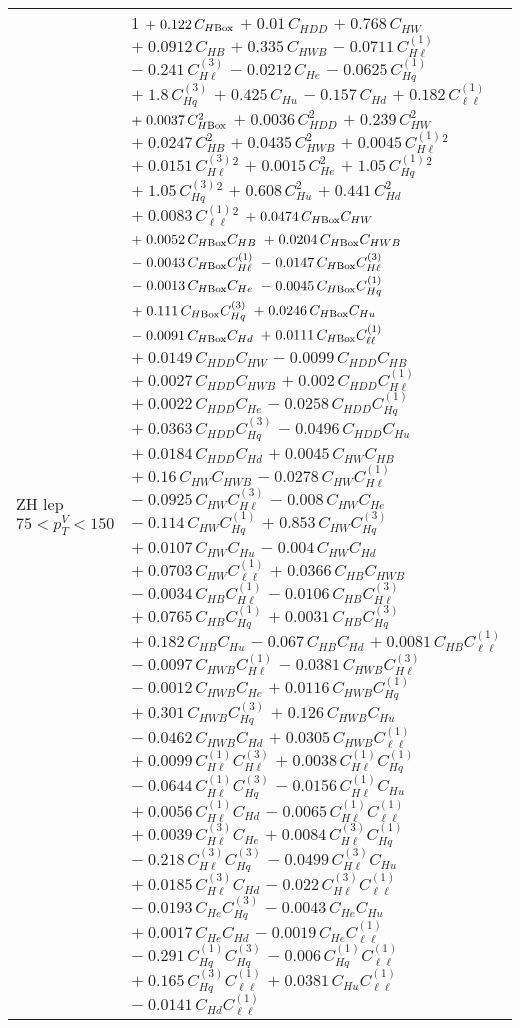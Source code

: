 \begin{tabular}{l|p{}}
    ZH lep $75 < p_{T}^{V} < 150$ & 1 $+\;0.122\,C_{H\rm{Box}}$ $+\;0.01\,C_{HDD}$ $+\;0.768\,C_{HW}$ $+\;0.0912\,C_{HB}$ $+\;0.335\,C_{HWB}$ $-\;0.0711\,C^{(1)}_{H\ell}$ $-\;0.241\,C^{(3)}_{H\ell}$ $-\;0.0212\,C_{He}$ $-\;0.0625\,C^{(1)}_{Hq}$ $+\;1.8\,C^{(3)}_{Hq}$ $+\;0.425\,C_{Hu}$ $-\;0.157\,C_{Hd}$ $+\;0.182\,C^{(1)}_{\ell\ell}$ $+\;0.0037\,C_{H\rm{Box}}^{2}$ $+\;0.0036\,C_{HDD}^{2}$ $+\;0.239\,C_{HW}^{2}$ $+\;0.0247\,C_{HB}^{2}$ $+\;0.0435\,C_{HWB}^{2}$ $+\;0.0045\,C^{(1)}_{H\ell}^{2}$ $+\;0.0151\,C^{(3)}_{H\ell}^{2}$ $+\;0.0015\,C_{He}^{2}$ $+\;1.05\,C^{(1)}_{Hq}^{2}$ $+\;1.05\,C^{(3)}_{Hq}^{2}$ $+\;0.608\,C_{Hu}^{2}$ $+\;0.441\,C_{Hd}^{2}$ $+\;0.0083\,C^{(1)}_{\ell\ell}^{2}$ $+\;0.0474\,C_{H\rm{Box}}C_{HW}$ $+\;0.0052\,C_{H\rm{Box}}C_{HB}$ $+\;0.0204\,C_{H\rm{Box}}C_{HWB}$ $-\;0.0043\,C_{H\rm{Box}}C^{(1)}_{H\ell}$ $-\;0.0147\,C_{H\rm{Box}}C^{(3)}_{H\ell}$ $-\;0.0013\,C_{H\rm{Box}}C_{He}$ $-\;0.0045\,C_{H\rm{Box}}C^{(1)}_{Hq}$ $+\;0.111\,C_{H\rm{Box}}C^{(3)}_{Hq}$ $+\;0.0246\,C_{H\rm{Box}}C_{Hu}$ $-\;0.0091\,C_{H\rm{Box}}C_{Hd}$ $+\;0.0111\,C_{H\rm{Box}}C^{(1)}_{\ell\ell}$ $+\;0.0149\,C_{HDD}C_{HW}$ $-\;0.0099\,C_{HDD}C_{HB}$ $+\;0.0027\,C_{HDD}C_{HWB}$ $+\;0.002\,C_{HDD}C^{(1)}_{H\ell}$ $+\;0.0022\,C_{HDD}C_{He}$ $-\;0.0258\,C_{HDD}C^{(1)}_{Hq}$ $+\;0.0363\,C_{HDD}C^{(3)}_{Hq}$ $-\;0.0496\,C_{HDD}C_{Hu}$ $+\;0.0184\,C_{HDD}C_{Hd}$ $+\;0.0045\,C_{HW}C_{HB}$ $+\;0.16\,C_{HW}C_{HWB}$ $-\;0.0278\,C_{HW}C^{(1)}_{H\ell}$ $-\;0.0925\,C_{HW}C^{(3)}_{H\ell}$ $-\;0.008\,C_{HW}C_{He}$ $-\;0.114\,C_{HW}C^{(1)}_{Hq}$ $+\;0.853\,C_{HW}C^{(3)}_{Hq}$ $+\;0.0107\,C_{HW}C_{Hu}$ $-\;0.004\,C_{HW}C_{Hd}$ $+\;0.0703\,C_{HW}C^{(1)}_{\ell\ell}$ $+\;0.0366\,C_{HB}C_{HWB}$ $-\;0.0034\,C_{HB}C^{(1)}_{H\ell}$ $-\;0.0106\,C_{HB}C^{(3)}_{H\ell}$ $+\;0.0765\,C_{HB}C^{(1)}_{Hq}$ $+\;0.0031\,C_{HB}C^{(3)}_{Hq}$ $+\;0.182\,C_{HB}C_{Hu}$ $-\;0.067\,C_{HB}C_{Hd}$ $+\;0.0081\,C_{HB}C^{(1)}_{\ell\ell}$ $-\;0.0097\,C_{HWB}C^{(1)}_{H\ell}$ $-\;0.0381\,C_{HWB}C^{(3)}_{H\ell}$ $-\;0.0012\,C_{HWB}C_{He}$ $+\;0.0116\,C_{HWB}C^{(1)}_{Hq}$ $+\;0.301\,C_{HWB}C^{(3)}_{Hq}$ $+\;0.126\,C_{HWB}C_{Hu}$ $-\;0.0462\,C_{HWB}C_{Hd}$ $+\;0.0305\,C_{HWB}C^{(1)}_{\ell\ell}$ $+\;0.0099\,C^{(1)}_{H\ell}C^{(3)}_{H\ell}$ $+\;0.0038\,C^{(1)}_{H\ell}C^{(1)}_{Hq}$ $-\;0.0644\,C^{(1)}_{H\ell}C^{(3)}_{Hq}$ $-\;0.0156\,C^{(1)}_{H\ell}C_{Hu}$ $+\;0.0056\,C^{(1)}_{H\ell}C_{Hd}$ $-\;0.0065\,C^{(1)}_{H\ell}C^{(1)}_{\ell\ell}$ $+\;0.0039\,C^{(3)}_{H\ell}C_{He}$ $+\;0.0084\,C^{(3)}_{H\ell}C^{(1)}_{Hq}$ $-\;0.218\,C^{(3)}_{H\ell}C^{(3)}_{Hq}$ $-\;0.0499\,C^{(3)}_{H\ell}C_{Hu}$ $+\;0.0185\,C^{(3)}_{H\ell}C_{Hd}$ $-\;0.022\,C^{(3)}_{H\ell}C^{(1)}_{\ell\ell}$ $-\;0.0193\,C_{He}C^{(3)}_{Hq}$ $-\;0.0043\,C_{He}C_{Hu}$ $+\;0.0017\,C_{He}C_{Hd}$ $-\;0.0019\,C_{He}C^{(1)}_{\ell\ell}$ $-\;0.291\,C^{(1)}_{Hq}C^{(3)}_{Hq}$ $-\;0.006\,C^{(1)}_{Hq}C^{(1)}_{\ell\ell}$ $+\;0.165\,C^{(3)}_{Hq}C^{(1)}_{\ell\ell}$ $+\;0.0381\,C_{Hu}C^{(1)}_{\ell\ell}$ $-\;0.0141\,C_{Hd}C^{(1)}_{\ell\ell}$ \\

\end{tabular}
